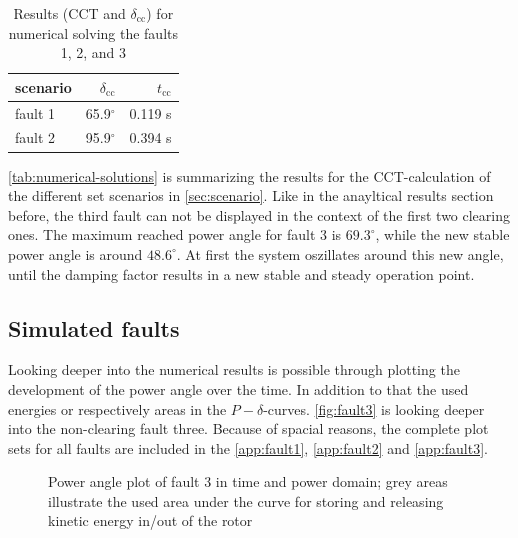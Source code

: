 \begin{table}
        \vspace{-12pt}
        \small
        \centering
        \caption[Numerical results for \acs{CCT}-calculations]{Results (\acs{CCT} and $\delta_\mathrm{cc}$) for numerical solving the faults 1, 2, and 3}
        \label{tab:numerical-solutions}
        \vspace{12pt}
        \begin{tabular}{|l|r|r|}
                \hline
                \rowcolor{lightgray} scenario & $\delta_\mathrm{cc}$ & $t_\mathrm{cc}$ \\ \hline \hline
                fault 1                       & 65.9$^\circ$          & 0.119 s                     \\ \hline
                fault 2                       & 95.9$^\circ$          & 0.394 s                     \\ \hline
        \end{tabular}
\end{table}
\autoref{tab:numerical-solutions} is summarizing the results for the \acs{CCT}-calculation of the different set scenarios in \autoref{sec:scenario}. Like in the anayltical results section before, the third fault can not be displayed in the context of the first two clearing ones. The maximum reached power angle for fault 3 is $69.3^\circ$, while the new stable power angle is around $48.6^\circ$. At first the system oszillates around this new angle, until the damping factor results in a new stable and steady operation point.

\subsection{Simulated faults}

Looking deeper into the numerical results is possible through plotting the development of the power angle over the time. In addition to that the used energies or respectively areas in the $P-\delta$-curves. \autoref{fig:fault3} is looking deeper into the non-clearing fault three. Because of spacial reasons, the complete plot sets for all faults are included in the \autoref{app:fault1}, \autoref{app:fault2} and \autoref{app:fault3}.

\begin{figure}[H]
        \centering
        
        \caption[Power angle plot of fault 3]{Power angle plot of fault 3 in time and power domain; grey areas illustrate the used area under the curve for storing and releasing kinetic energy in/out of the rotor}
        \label{fig:fault3}
\end{figure}

